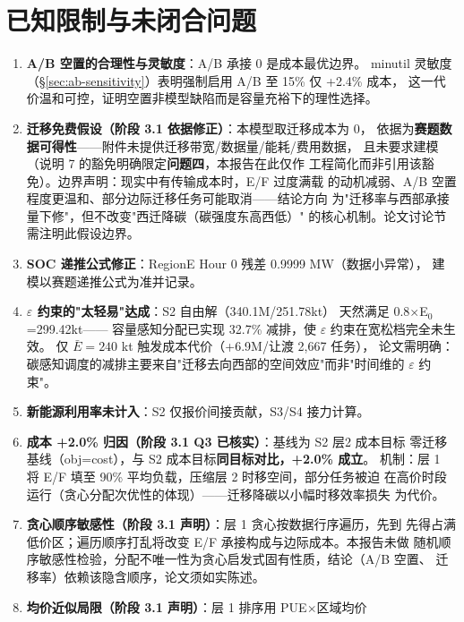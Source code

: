 \documentclass{internal-report}
\begin{document}
\section{已知限制与未闭合问题}

\begin{enumerate}
  \item \textbf{A/B 空置的合理性与灵敏度}：A/B 承接 0 是成本最优边界。
        minutil 灵敏度（§\ref{sec:ab-sensitivity}）表明强制启用 A/B 至 15\% 仅 +2.4\% 成本，
        这一代价温和可控，证明空置非模型缺陷而是容量充裕下的理性选择。
  \item \textbf{迁移免费假设（阶段 3.1 依据修正）}：本模型取迁移成本为 0，
        依据为\textbf{赛题数据可得性}——附件未提供迁移带宽/数据量/能耗/费用数据，
        且未要求建模（说明 7 的豁免明确限定\textbf{问题四}，本报告在此仅作
        工程简化而非引用该豁免）。边界声明：现实中有传输成本时，E/F 过度满载
        的动机减弱、A/B 空置程度更温和、部分边际迁移任务可能取消——结论方向
        为"迁移率与西部承接量下修"，但不改变"西迁降碳（碳强度东高西低）"
        的核心机制。论文讨论节需注明此假设边界。
  \item \textbf{SOC 递推公式修正}：RegionE Hour 0 残差 0.9999 MW（数据小异常），
        建模以赛题递推公式为准并记录。
  \item \textbf{$\varepsilon$ 约束的"太轻易"达成}：S2 自由解（340.1M/251.78kt）
        天然满足 0.8$\times$E$_0$=299.42kt——
        容量感知分配已实现 32.7\% 减排，使 $\varepsilon$ 约束在宽松档完全未生效。
        仅 $\bar{E}=240$ kt 触发成本代价（+6.9M/让渡 2{,}667 任务），
        论文需明确：碳感知调度的减排主要来自"迁移去向西部的空间效应"而非"时间维的 $\varepsilon$ 约束"。
  \item \textbf{新能源利用率未计入}：S2 仅报价间接贡献，S3/S4 接力计算。
  \item \textbf{成本 +2.0\% 归因（阶段 3.1 Q3 已核实）}：基线为 S2 层2 成本目标
        零迁移基线（obj=cost），与 S2 成本目标\textbf{同目标对比，+2.0\% 成立}。
        机制：层 1 将 E/F 填至 90\% 平均负载，压缩层 2 时移空间，部分任务被迫
        在高价时段运行（贪心分配次优性的体现）——迁移降碳以小幅时移效率损失
        为代价。
  \item \textbf{贪心顺序敏感性（阶段 3.1 声明）}：层 1 贪心按数据行序遍历，先到
        先得占满低价区；遍历顺序打乱将改变 E/F 承接构成与边际成本。本报告未做
        随机顺序敏感性检验，分配不唯一性为贪心启发式固有性质，结论（A/B 空置、
        迁移率）依赖该隐含顺序，论文须如实陈述。
  \item \textbf{均价近似局限（阶段 3.1 声明）}：层 1 排序用 PUE$\times$区域均价

\end{enumerate}
\end{document}
